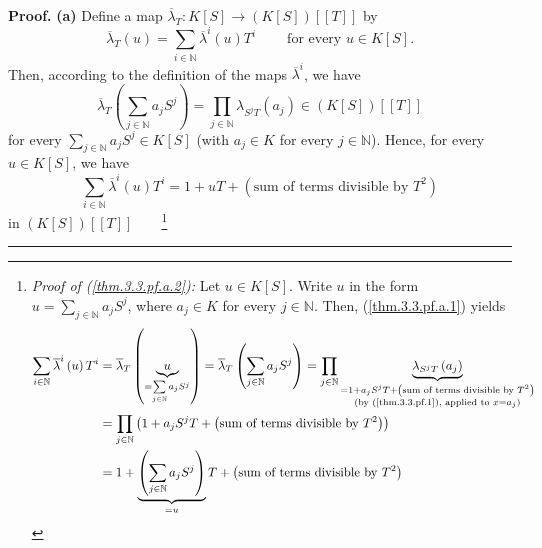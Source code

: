 \documentclass[numbers=enddot,12pt,final,onecolumn,notitlepage]{scrartcl}%
\newenvironment{proof}[1][Proof]{\noindent\textbf{#1.} }{\ \rule{0.5em}{0.5em}}
\begin{document}
\begin{proof}
\textbf{(a)} Define a map $\overline{\lambda}_{T}:K\left[  S\right]
\rightarrow\left(  K\left[  S\right]  \right)  \left[  \left[  T\right]
\right]  $ by%
\begin{equation}
\overline{\lambda}_{T}\left(  u\right)  =\sum\limits_{i\in\mathbb{N}}%
\overline{\lambda}^{i}\left(  u\right)  T^{i}\ \ \ \ \ \ \ \ \ \ \text{for
every }u\in K\left[  S\right]  . \label{thm.3.3.pf.a.1}%
\end{equation}
Then, according to the definition of the maps $\overline{\lambda}^{i}$, we
have
\begin{equation}
\overline{\lambda}_{T}\left(  \sum\limits_{j\in\mathbb{N}}a_{j}S^{j}\right)
=\prod\limits_{j\in\mathbb{N}}\lambda_{S^{j}T}\left(  a_{j}\right)  \in\left(
K\left[  S\right]  \right)  \left[  \left[  T\right]  \right]
\label{thm.3.3.pf.a.lambdaol}%
\end{equation}
for every $\sum\limits_{j\in\mathbb{N}}a_{j}S^{j}\in K\left[  S\right]  $
(with $a_{j}\in K$ for every $j\in\mathbb{N}$). Hence, for every $u\in
K\left[  S\right]  $, we have%
\begin{equation}
\sum\limits_{i\in\mathbb{N}}\overline{\lambda}^{i}\left(  u\right)
T^{i}=1+uT+\left(  \text{sum of terms divisible by }T^{2}\right)
\label{thm.3.3.pf.a.2}%
\end{equation}
in $\left(  K\left[  S\right]  \right)  \left[  \left[  T\right]  \right]
$\ \ \ \ \footnote{\textit{Proof of (\ref{thm.3.3.pf.a.2}):} Let $u\in
K\left[  S\right]  $. Write $u$ in the form $u=\sum\limits_{j\in\mathbb{N}%
}a_{j}S^{j}$, where $a_{j}\in K$ for every $j\in\mathbb{N}$. Then,
(\ref{thm.3.3.pf.a.1}) yields%
\begin{align*}
\sum\limits_{i\in\mathbb{N}}\overline{\lambda}^{i}\left(  u\right)  T^{i}  &
=\overline{\lambda}_{T}\left(  \underbrace{u}_{=\sum\limits_{j\in\mathbb{N}%
}a_{j}S^{j}}\right)  =\overline{\lambda}_{T}\left(  \sum\limits_{j\in
\mathbb{N}}a_{j}S^{j}\right)  =\prod\limits_{j\in\mathbb{N}}%
\underbrace{\lambda_{S^{j}T}\left(  a_{j}\right)  }_{\substack{=1+a_{j}%
S^{j}T+\left(  \text{sum of terms divisible by }T^{2}\right)  \\\text{(by
(\ref{thm.3.3.pf.1}), applied to }x=a_{j}\text{)}}}\\
&  =\prod\limits_{j\in\mathbb{N}}\left(  1+a_{j}S^{j}T+\left(  \text{sum of
terms divisible by }T^{2}\right)  \right) \\
&  =1+\underbrace{\left(  \sum\limits_{j\in\mathbb{N}}a_{j}S^{j}\right)
}_{=u}T+\left(  \text{sum of terms divisible by }T^{2}\right) \\

\end{align*}}
\end{proof}
\end{document}
